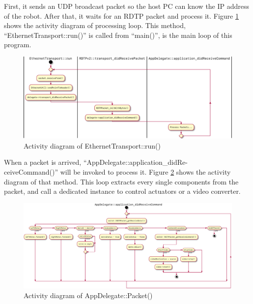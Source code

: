 \documentclass[journal]{IEEEtran}
\begin{document}
First, it sends an UDP broadcast packet so the host PC can know the IP address of the robot.
After that, it waits for an RDTP packet and process it.
Figure \ref{fig:transport} shows the activity diagram of processing loop.
This method, ``EthernetTransport::run()'' is called from ``main()'', is the main loop of this program.
\begin{figure}
    \centering
    \includegraphics[width=1.0\textwidth]{transport.pdf}
    \caption{Activity diagram of EthernetTransport::run()} \label{fig:transport}
\end{figure}

When a packet is arrived, ``AppDelegate::application\_didRe-\\ceiveCommand()'' will be invoked to process it.
Figure \ref{fig:appdelegate} shows the activity diagram of that method.
This loop extracts every single components from the packet, and call a dedicated instance to control actuators or a video converter.
\begin{figure}
    \centering
    \includegraphics[width=1.0\textwidth]{appdelegate_packet.pdf}
    \caption{Activity diagram of AppDelegate::Packet()} \label{fig:appdelegate}
\end{figure}
\end{document}
